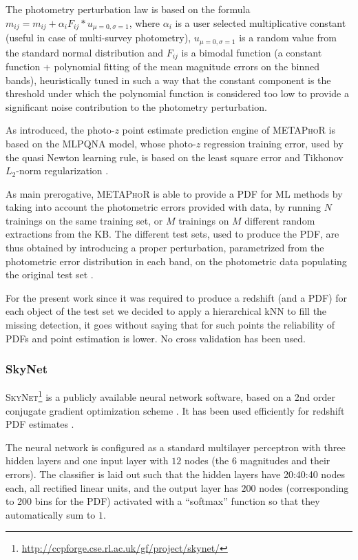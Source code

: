 The photometry perturbation law is based on the formula $m_{ij} = m_{ij} + \alpha_{i}F_{ij}*u_{\mu=0,\sigma=1}$, where $\alpha_{i}$ is a user selected multiplicative constant (useful in case of multi-survey photometry), $u_{\mu=0,\sigma=1}$ is a random value from the standard normal distribution and $F_{ij}$ is a bimodal function (a constant function + polynomial fitting of the mean magnitude errors on the binned bands), heuristically tuned in such a way that the constant component is the threshold under which the polynomial function is considered too low to provide a significant noise contribution to the photometry perturbation.

As introduced, the photo-$z$ point estimate prediction engine of \textsc{METAPhoR} is based on the MLPQNA model, whose photo-$z$ regression training error, used by the quasi Newton learning rule, is based on the least square error and Tikhonov $L_{2}$-norm regularization \citep{Hofmann:18}.

As main prerogative, \textsc{METAPhoR} is able to provide a PDF for ML methods by taking into account the photometric errors provided with data, by running $N$ trainings on the same training set, or $M$ trainings on $M$ different random extractions from the KB. The different test sets, used to produce the PDF, are thus obtained by introducing a proper perturbation, parametrized from the photometric error distribution in each band, on the photometric data populating the original test set \citep{Brescia:18}.

For the present work since it was required to produce a redshift (and a PDF) for each object of the test set we decided to apply a hierarchical kNN to fill the missing detection, it goes without saying that for such points the reliability of PDFs and point estimation is lower. No cross validation has been used.


\subsubsection{SkyNet}
\label{sec:skynet}

\textsc{SkyNet}\footnote{\url{http://ccpforge.cse.rl.ac.uk/gf/project/skynet/}} \citep{Graff:14} is a publicly available neural network software, based on a 2nd order conjugate gradient optimization scheme \citep[see][for further details]{Graff:14}. It has been used efficiently for redshift PDF estimates \citep{Sanchez:14,Bonnett:15,Bonnett:16}.

The neural network is configured as a standard multilayer perceptron with three hidden layers and one input layer with $12$ nodes (the $6$ magnitudes and their errors).
The classifier is laid out such that the hidden layers have 20:40:40 nodes each, all rectified linear units, and the output layer has $200$ nodes (corresponding to 200 bins for the PDF) activated with a ``softmax'' function so that they automatically sum to $1$.

